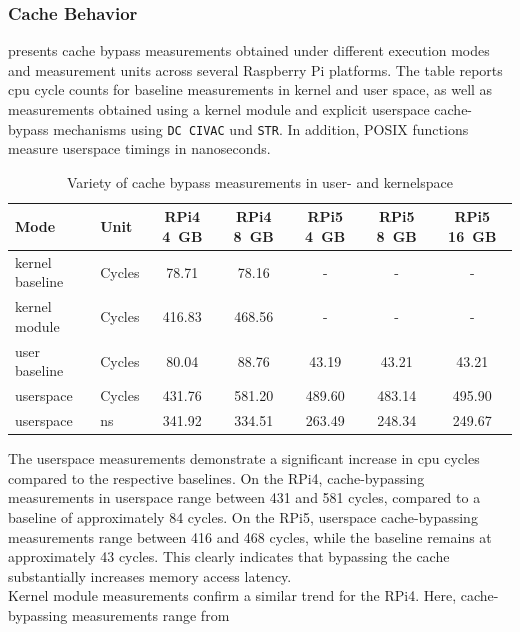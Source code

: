     \subsubsection{Cache Behavior} \label{subsubsec:cache-behavior}
         presents cache bypass measurements obtained under 
        different execution modes and measurement units 
        across several Raspberry Pi platforms. The table reports \gls{cpu} cycle counts for baseline measurements in 
        kernel and user space, as well as measurements obtained using a kernel module and explicit userspace 
        cache-bypass mechanisms using \texttt{DC CIVAC} und \texttt{STR}. In addition, POSIX functions measure userspace timings in nanoseconds.
        \begin{table}[ht]
            \centering
            \begin{tabular}{llccccc}
                \hline
                Mode & Unit & RPi4 4~GB & RPi4 8~GB & RPi5 4~GB & RPi5 8~GB & RPi5 16~GB \\
                \hline
                kernel baseline & Cycles & 78.71 & 78.16 & - & - & - \\
                kernel module & Cycles & 416.83 & 468.56 & - & - & - \\
                user baseline & Cycles & 80.04 & 88.76 & 43.19 & 43.21 & 43.21 \\
                userspace & Cycles & 431.76 & 581.20 & 489.60 & 483.14 & 495.90 \\
                userspace & ns & 341.92 & 334.51 & 263.49 & 248.34 & 249.67 \\
            \hline
            \end{tabular}
            \caption{Variety of cache bypass measurements in user- and kernelspace}
            \label{tab:cache-bypass}
        \end{table}
        The userspace measurements demonstrate a significant increase in \gls{cpu} cycles compared to the respective baselines. 
        On the RPi4, cache-bypassing measurements in userspace range between 431 and 581 cycles, compared to a baseline 
        of approximately 84 cycles. On the RPi5, userspace cache-bypassing measurements range between 416 and 468 cycles, 
        while the baseline remains at approximately 43 cycles. This clearly indicates that bypassing the cache substantially increases
        memory access latency.
        \\
        Kernel module measurements confirm a similar trend for the RPi4. Here, cache-bypassing measurements range from 
